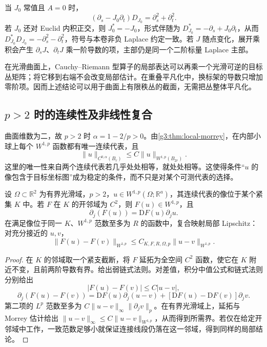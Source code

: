 \begin{example}\label{g3:exm:cr-factorization}
	当 \(J_0\) 常值且 \(A=0\) 时，
	\[
		(\partial_s-J_0\partial_t)D_{J_0}
		=\partial_s^2+\partial_t^2.
	\]
	若 \(J_0\) 还对 Euclid 内积正交，则 \(J_0^*=-J_0\)，形式伴随为 \(D_{J_0}^*=-\partial_s+J_0\partial_t\)，从而
	\(D_{J_0}^*D_{J_0}=-\partial_s^2-\partial_t^2\)，符号与本卷非负 Laplace 约定一致。若 \(J\) 随点变化，展开乘积会产生 \(\partial_sJ\)、\(\partial_tJ\) 乘一阶导数的项，主部仍是同一个二阶标量 Laplace 主部。
\end{example}

在光滑曲面上，Cauchy--Riemann 型算子的局部表达可以再乘一个光滑可逆的目标丛矩阵；将它移到右端不会改变局部估计。在重叠平凡化中，换标架的导数只增加零阶项。因而上述结论可以用于曲面上有限秩丛的截面，无需把丛整体平凡化。

\subsection{\texorpdfstring{\(p>2\) 时的连续性及非线性复合}{p>2 时的连续性及非线性复合}}
\label{g3:subsec:1206:02}
曲面维数为二，故 \(p>2\) 时 \(\alpha=1-2/p>0\)。由\cref{g3:thm:local-morrey}，在内部小球上每个 \(W^{1,p}\) 函数都有唯一连续代表，且
\[
	\|u\|_{C^{0,\alpha}(B_r)}\le C\|u\|_{W^{1,p}(B_{2r})}.
\]
这里的唯一性来自两个连续代表若几乎处处相等，就处处相等。这使得条件“\(u\) 的像包含于目标坐标图”成为稳定的条件，而不只是对某个可测代表的选择。

\begin{proposition}\label{g3:prop:surface-w1p-composition}
	设 \(\Omega\subset\mathbb R^2\) 为有界光滑域，\(p>2\)，\(u\in W^{1,p}(\Omega;\mathbb R^a)\)，其连续代表的像位于某个紧集 \(K\) 中。若 \(F\) 在 \(K\) 的开邻域为 \(C^2\)，则 \(F(u)\in W^{1,p}\)，且
	\[
		\partial_j(F(u))=\mathrm DF(u)\partial_j u.
	\]
	在满足像位于同一 \(K\)、\(W^{1,p}\) 范数至多为 \(R\) 的函数中，复合映射局部 Lipschitz：对充分接近的 \(u,v\)，
	\[
		\|F(u)-F(v)\|_{W^{1,p}}\le C_{K,F,R,\Omega,p}\|u-v\|_{W^{1,p}}.
	\]
\end{proposition}
\begin{proof}
	在 \(K\) 的邻域取一个紧支截断，将 \(F\) 延拓为全空间 \(C^2\) 函数，使它在 \(K\) 附近不变，且前两阶导数有界。给出弱链式法则。对差值，积分中值公式和链式法则分别给出
	\[
		|F(u)-F(v)|\le C|u-v|,
	\]
	\[
		\partial_j(F(u)-F(v))
		=\mathrm DF(u)\partial_j(u-v)
		+[\mathrm DF(u)-\mathrm DF(v)]\partial_jv.
	\]
	第二项的 \(L^p\) 范数至多为 \(C\|u-v\|_\infty\|\partial_jv\|_p\)。在有界光滑域上，延拓与 Morrey 估计给出 \(\|u-v\|_\infty\le C\|u-v\|_{W^{1,p}}\)，从而得到所需界。若仅在给定开邻域中工作，一致范数足够小就保证连接线段仍落在这一邻域，得到同样的局部结论。
\end{proof}

